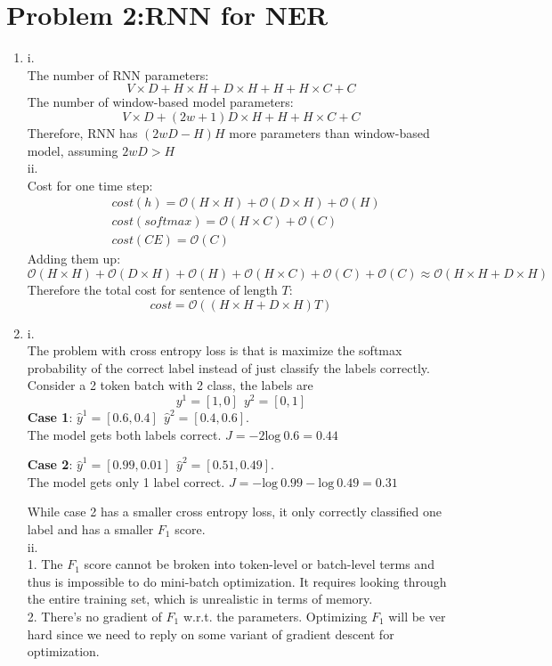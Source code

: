 \documentclass[10pt]{article}
\begin{document}
\section*{Problem 2:RNN for NER}
\begin{enumerate}[label=(\alph*)]
\item
i.\\
The number of RNN parameters:
$$
V \times D + H \times H + D \times H + H + H \times C + C
$$
The number of window-based model parameters:
$$
V \times D + (2w+1)D \times H + H + H \times C + C
$$
Therefore, RNN has $(2wD - H)H$ more parameters than window-based model, assuming $2wD > H$\\

ii.\\
Cost for one time step:
$$
\begin{aligned}
& cost(h) = \mathcal{O}(H \times H) + \mathcal{O}(D \times H) + \mathcal{O}(H)\\
& cost(softmax) = \mathcal{O}(H \times C) + \mathcal{O}(C)\\
& cost(CE) = \mathcal{O}(C)
\end{aligned}
$$
Adding them up:
$$
\mathcal{O}(H \times H) + \mathcal{O}(D \times H) + \mathcal{O}(H) + \mathcal{O}(H \times C) + \mathcal{O}(C) + \mathcal{O}(C) \approx \mathcal{O}(H \times H + D \times H)
$$
Therefore the total cost for sentence of length $T$:
$$
cost =  \mathcal{O}((H \times H + D \times H)T)
$$

\item
i.\\
The problem with cross entropy loss is that is maximize the softmax probability of the correct label instead of just classify the labels correctly. Consider a 2 token batch with 2 class, the labels are
$$y^{1} = [1, 0] \ \  y^{2} = [0, 1]$$
\textbf{Case 1}: $\hat{y}^{1} = [0.6, 0.4] \ \ \hat{y}^{2} = [0.4, 0.6]$. \\
The model gets both labels correct. $J = -2\text{log} \ 0.6 = 0.44$\par
\textbf{Case 2}: $\hat{y}^{1} = [0.99, 0.01] \ \ \hat{y}^{2} = [0.51, 0.49]$.\\
The model gets only 1 label correct. $J = -\text{log} \ 0.99 -\text{log} \ 0.49 = 0.31$\par
While case 2 has a smaller cross entropy loss, it only correctly classified one label and has a smaller $F_1$ score.\\

ii.\\
1. The $F_1$ score cannot be broken into token-level or batch-level terms and thus is impossible to do mini-batch optimization.
It requires looking through the entire training set, which is unrealistic in terms of memory. \\
2. There's no gradient of $F_1$ w.r.t. the parameters.
Optimizing $F_1$ will be ver hard since we need to reply on some variant of gradient descent for optimization.\\


\end{enumerate}
\end{document}
